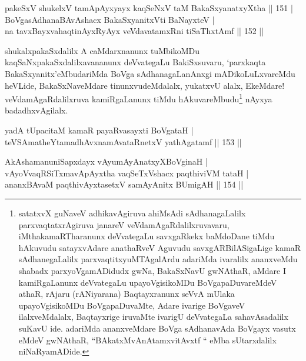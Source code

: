 \begin{shl}
pakeSxV shukelxV tamApAyxyayx kaqSeNxV taM BakaSxyanatxyXtha \hfill|| 151 | \\
BoVgasAdhanaBAvAshacx BakaSxyanitxVti BaNayxteV | \\
na tavxBayxvahaqtinAyxRyAyx veVdavatamxRni tiSaThxtAmf \hfill|| 152 || 
\end{shl}

\begin{artha}
shukalxpakaSxdalilx A caMdarxnanunx tuMbikoMDu kaqSaNxpakaSxdalilxavananunx deVvategaLu BakiSxsuvaru, `parxkaqta BakaSxyanitx'eMbudariMda BoVga sAdhanagaLanAnxgi mADikoLuLxva\-reMdu heVLide, BakaSxNaveMdare tinunxvudeMdalalx, yukatxvU alalx, EkeMdare! veVda\-mAgaRdalilxruva kamiRgaLanunx tiMdu hAkuvareMbudu\footnote[1]{satatxvX guNaveV adhikavAgiruva ahiMsAdi sAdhanagaLalilx parxvaqtatxrAgiruva  janareV veVdamAgaR\-dalilxruvavaru, iMthakamaRTharanunx deVvategaLu  savxgaRkekx baMdoDane tiMdu hAkuvudu satayxvAdare anathaRveV Aguvudu  savxgARBilASigaLige kamaR sAdhanegaLalilx parxvaqtitxyuMTAgalArdu  adariMda ivaralilx ananxveMdu shabadx parxyoVgamADidudx gwNa,  BakaSxNavU gwNAthaR, aMdare I kamiRgaLanunx deVvategaLu  upayoVgisikoMDu BoVgapaDuvareMdeV athaR, rAjaru (rANiyarana)  Baqtayxranunx seVvA mUlaka upayoVgisikoMDu BoVgapaDuvaMte, Adare  ivarige BoVgaveV ilalxveMdalalx, Baqtayxrige iruvaMte ivarigU  deVvategaLa sahavAsadalilx suKavU ide. adariMda ananxveMdare BoVga  sAdhanavAda BoVgayx vasutx eMdeV gwNAthaR, ``BAkatxMvA\s  nAtamxvitAvxtf `` eMba sUtarxdalilx niNaRyamADide.} nAyxya badadhxvAgilalx.
\end{artha}


\begin{shl}
yadA tUpacitaM kamaR payaRvasayxti BoVgataH | \\
teVSAmatheYtamadhAvxnamAvataRnetxV yathAgatamf \hfill|| 153 || 
\end{shl}

\begin{shl}
AkAshamanuniSapxdayx vAyumAyAnatxyX\footnotemark[2]BoVginaH | \\
vAyoVvaqRSiTxmavApAyxtha vaqSeTxVshacx paqthiviVM tataH | \\
ananxBAvaM paqthivAyx\s tasetxV samAyAnitx BUmigAH \hfill|| 154 || 
\end{shl}

